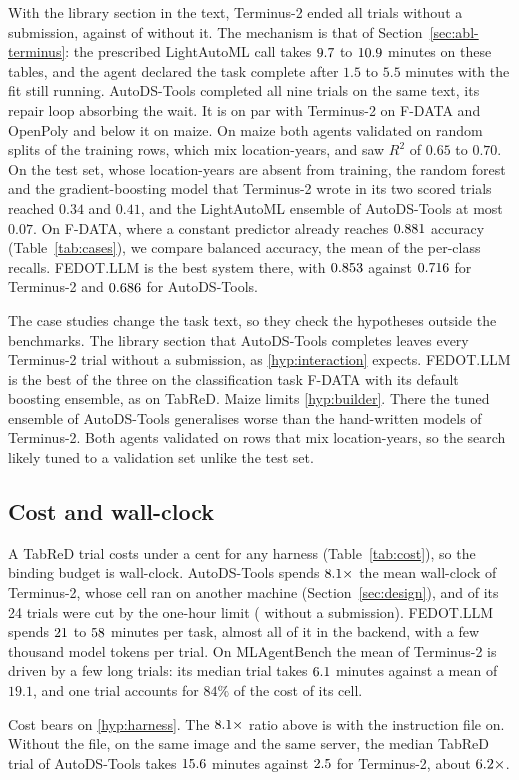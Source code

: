 With the library section in the text, Terminus-2 ended all
\caseTermPrescTotal{} trials without a submission, against
\caseTermPlainLost{} of \caseTermPlainTotal{} without it. The mechanism is
that of Section~\ref{sec:abl-terminus}: the prescribed LightAutoML call takes
$9.7$ to $10.9$ minutes on these tables, and
the agent declared the task complete after $1.5$ to $5.5$ minutes with the
fit still running. AutoDS-Tools completed all nine trials on the same
text, its repair loop absorbing the wait. It is on par with Terminus-2 on
F-DATA and OpenPoly and below it on maize. On maize both agents validated
on random splits of the training rows, which mix location-years, and saw
$R^2$ of $0.65$ to $0.70$. On the test set, whose location-years are absent
from training, the random forest and the gradient-boosting model that
Terminus-2 wrote in its two scored trials reached $0.34$ and $0.41$, and the LightAutoML ensemble of AutoDS-Tools at most $0.07$. On F-DATA,
where a constant predictor already reaches $0.881$ accuracy
(Table~\ref{tab:cases}), we compare balanced accuracy, the mean of the
per-class recalls.
FEDOT.LLM is the best system there, with $0.853$
against $0.716$ for Terminus-2 and
$0.686$ for AutoDS-Tools.

The case studies change the task text, so they check the hypotheses outside
the benchmarks. The library section that AutoDS-Tools completes leaves every
Terminus-2 trial without a submission, as \ref{hyp:interaction} expects.
FEDOT.LLM is the best of the three on the classification task F-DATA with
its default boosting ensemble, as on TabReD. Maize limits \ref{hyp:builder}.
There the tuned ensemble of AutoDS-Tools generalises worse than the
hand-written models of Terminus-2. Both agents validated on rows that mix
location-years, so the search likely tuned to a validation set unlike the
test set.

\subsection{Cost and wall-clock}
\label{sec:cost}


A TabReD trial costs under a cent for any harness (Table~\ref{tab:cost}),
so the binding budget is wall-clock. AutoDS-Tools spends
$8.1\times$ the mean wall-clock of Terminus-2, whose cell ran on
another machine (Section~\ref{sec:design}), and \rerunCut{} of
its 24 trials were cut by the one-hour limit (\rerunLost{} without a
submission). FEDOT.LLM spends $21$ to
$58$ minutes per task, almost all of it in the backend,
with a few thousand model tokens per trial. On
MLAgentBench the mean of Terminus-2 is driven by a few long trials: its
median trial takes $6.1$ minutes against a mean of $19.1$, and
one trial accounts for $84\%$ of the cost of its cell.

Cost bears on \ref{hyp:harness}. The $8.1\times$ ratio above is
with the instruction file on. Without the file, on the same image and the
same server, the median TabReD trial of AutoDS-Tools takes $15.6$ minutes against
$2.5$ for Terminus-2, about $6.2\times$.
